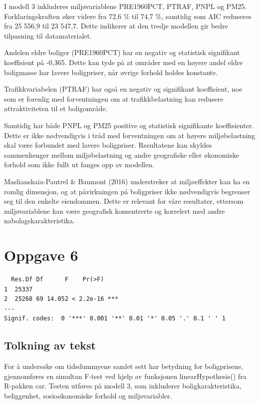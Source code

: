 \documentclass[
  norsk,
  a4paper,
]{article}
\begin{document}
I modell 3 inkluderes miljøvariablene PRE1960PCT, PTRAF, PNPL og PM25.
Forklaringskraften øker videre fra 72,6 \% til 74,7 \%, samtidig som AIC
reduseres fra 25 556,9 til 23 547,7. Dette indikerer at den tredje
modellen gir bedre tilpasning til datamaterialet.

Andelen eldre boliger (PRE1960PCT) har en negativ og statistisk
signifikant koeffisient på -0,365. Dette kan tyde på at områder med en
høyere andel eldre boligmasse har lavere boligpriser, når øvrige forhold
holdes konstante.

Trafikkvariabelen (PTRAF) har også en negativ og signifikant
koeffisient, noe som er forenlig med forventningen om at
trafikkbelastning kan redusere attraktiviteten til et boligområde.

Samtidig har både PNPL og PM25 positive og statistisk signifikante
koeffisienter. Dette er ikke nødvendigvis i tråd med forventningen om at
høyere miljøbelastning skal være forbundet med lavere boligpriser.
Resultatene kan skyldes sammenhenger mellom miljøbelastning og andre
geografiske eller økonomiske forhold som ikke fullt ut fanges opp av
modellen.

Maslianskaia-Pautrel \& Baumont (2016) understreker at miljøeffekter kan
ha en romlig dimensjon, og at påvirkningen på boligpriser ikke
nødvendigvis begrenser seg til den enkelte eiendommen. Dette er relevant
for våre resultater, ettersom miljøvariablene kan være geografisk
konsentrerte og korrelert med andre nabolagskarakteristika.

\section{Oppgave 6}\label{oppgave-6}

\begin{verbatim}
  Res.Df Df      F    Pr(>F)    
1  25337                        
2  25268 69 14.052 < 2.2e-16 ***
---
Signif. codes:  0 '***' 0.001 '**' 0.01 '*' 0.05 '.' 0.1 ' ' 1
\end{verbatim}

\subsection{Tolkning av tekst}\label{tolkning-av-tekst}

For å undersøke om tidsdummyene samlet sett har betydning for
boligprisene, gjennomføres en simultan F-test ved hjelp av funksjonen
linearHypothesis() fra R-pakken car. Testen utføres på modell 3, som
inkluderer boligkarakteristika, beliggenhet, sosioøkonomiske forhold og
miljøvariabler.
\end{document}
